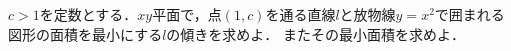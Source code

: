 \documentclass[../../main.tex]{subfiles}
\begin{document}
$c>1$を定数とする．$xy$平面で，点$(1,c)$を通る直線$l$と放物線$y=x^2$で囲まれる図形の面積を最小にする$l$の傾きを求めよ．
またその最小面積を求めよ．
\end{document}
